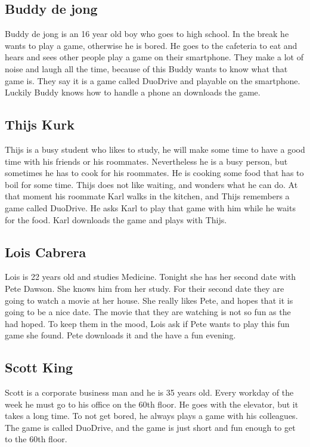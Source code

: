 \documentclass{article}
\begin{document}
\subsection{Buddy de jong}
Buddy de jong is an 16 year old boy who goes to high school. In the break he wants to play a game, otherwise he is bored. He goes to the cafeteria to eat and hears and sees other people play a game on their smartphone. They make a lot of noise and laugh all the time, because of this Buddy wants to know what that game is. They say it is a game called DuoDrive and playable on the smartphone. Luckily Buddy knows how to handle a phone an downloads the game.

\subsection{Thijs Kurk}
Thijs is a busy student who likes to study, he will make some time to have a good time with his friends or his roommates. Nevertheless he is a busy person, but sometimes he has to cook for his roommates. He is cooking some food that has to boil for some time. Thijs does not like waiting, and wonders what he can do. At that moment his roommate Karl walks in the kitchen, and Thijs remembers a game called DuoDrive. He asks Karl to play that game with him while he waits for the food. Karl downloads the game and plays with Thijs.

\subsection{Lois Cabrera}
Lois is 22 years old and studies Medicine. Tonight she has her second date with Pete Dawson. She knows him from her study. For their second date they are going to watch a movie at her house. She really likes Pete, and hopes that it is going to be a nice date. The movie that they are watching is not so fun as the had hoped. To keep them in the mood, Lois ask if Pete wants to play this fun game she found. Pete downloads it and the have a fun evening.

\subsection{Scott King}
Scott is a corporate business man and he is 35 years old. Every workday of the week he must go to his office on the 60th floor. He goes with the elevator, but it takes a long time. To not get bored, he always plays a game with his colleagues. The game is called DuoDrive, and the game is just short and fun enough to get to the 60th floor.
\end{document}
